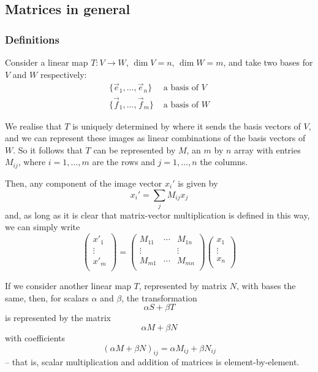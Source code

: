 \documentclass{../template/note}
\begin{document}
    \subsection{Matrices in general}

    \subsubsection{Definitions}

    Consider a linear map \(T: V \to W\), \(\dim V = n\), \(\dim W = m\), and take two bases for \(V\) and \(W\) respectively:
    \begin{align*}
        \{\vec e_1, \dots, \vec e_n\} &\text{ a basis of } V \\
        \{\vec f_1, \dots, \vec f_m\} &\text{ a basis of } W
    \end{align*}
    
    We realise that \(T\) is uniquely determined by where it sends the basis vectors of \(V\), and we can represent these images as linear combinations of the basis vectors of \(W\). So it follows that \(T\) can be represented by \(M\), an \(m\) by \(n\) array with entries \(M_{ij}\), where \(i = 1, \dots, m\) are the rows and \(j = 1, \dots, n\) the columns.
    
    Then, any component of the image vector \(x_i'\) is given by
    \[
        x_i' = \sum_j M_{ij} x_j
    \]
    and, as long as it is clear that matrix-vector multiplication is defined in this way, we can simply write
    \[
        \begin{pmatrix}
         x'_1 \\
         \vdots \\
         x'_m \\
        \end{pmatrix} =
        \begin{pmatrix}
         M_{11} & \cdots & M_{1n} \\
         \vdots &  & \vdots \\
         M_{m1} & \cdots & M_{mn} \\
        \end{pmatrix}
        \begin{pmatrix}
         x_1 \\
         \vdots \\
         x_n \\
        \end{pmatrix}
    \]
    
    If we consider another linear map \(T\), represented by matrix \(N\), with bases the same, then, for scalars \(\alpha\) and \(\beta\), the transformation
    \[
        \alpha S + \beta T
    \]
    is represented by the matrix
    \[
        \alpha M + \beta N
    \]
    with coefficients
    \[
        (\alpha M + \beta N)_{ij} = \alpha M_{ij} + \beta N_{ij}
    \]
    -- that is, scalar multiplication and addition of matrices is element-by-element.
\end{document}
